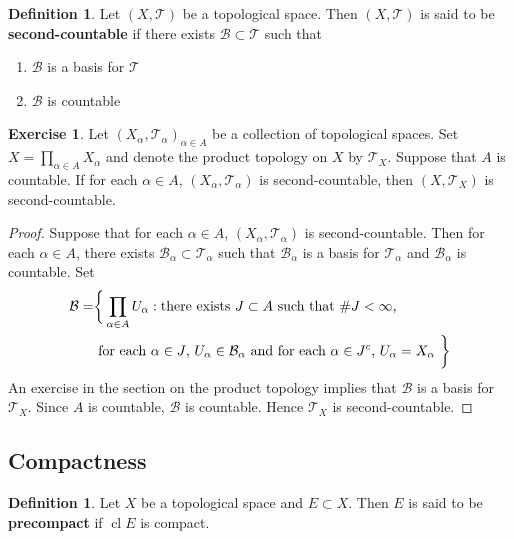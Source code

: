 \documentclass[12pt]{amsart}
\theoremstyle{definition}
\newtheorem{defn}[definition]{Definition}
\newtheorem{ex}[definition]{Exercise}
\newcommand{\al}{\alpha}
\newcommand{\MB}{\mathcal{B}}
\newcommand{\MT}{\mathcal{T}}
\newcommand{\tbf}[1]{\textbf{#1}}
\DeclareMathOperator{\cl}{cl}
\DeclareMathOperator*{\0}{\mbf{0}}
\DeclareMathOperator*{\1}{\mbf{1}}
\newcommand{\ld}[1]{\label{defn:#1}}
\begin{document}
	\begin{defn}
		Let $(X, \MT)$ be a topological space. Then $(X, \MT)$ is said to be \tbf{second-countable} if there exists $\MB \subset \MT$ such that 
		\begin{enumerate}
			\item $\MB$ is a basis for $\MT$
			\item $\MB$ is countable
		\end{enumerate} 
	\end{defn}

	\begin{ex}
		Let $(X_{\al}, \MT_{\al})_{\al \in A}$ be a collection of topological spaces. Set $X = \prod\limits_{\al \in A} X_{\al}$ and denote the product topology on $X$ by $\MT_X$. Suppose that $A$ is countable. If for each $\al \in A$, $(X_{\al}, \MT_{\al})$ is second-countable, then $(X, \MT_X)$ is second-countable. 
	\end{ex}

	\begin{proof}
		Suppose that for each $\al \in A$, $(X_{\al}, \MT_{\al})$ is second-countable. Then for each  $\al \in A$, there exists $\MB_{\al} \subset \MT_{\al}$ such that $\MB_{\al}$ is a basis for $\MT_{\al}$ and $\MB_{\al}$ is countable. Set 
		\begin{align*}
			\MB = 
			& \bigg \{\prod_{\al \in A} U_{\al}: \text{there exists $J \subset A$ such that $ \# J < \infty$, } \\
			& \text{ for each $\al \in J$, $U_{\al} \in \MB_{\al}$ and for each $\al \in J^c$, $U_{\al} = X_{\al}$ } \bigg \}
		\end{align*}  
		An exercise in the section on the product topology implies that $\MB$ is a basis for $\MT_X$. Since $A$ is countable, $\MB$ is countable. Hence $\MT_X$ is second-countable. 
	\end{proof}


	
	
	
	
	
	
	
	
	
	
	
	
	
	
	
	\newpage
	\subsection{Compactness}
	
	\begin{defn} \ld{}
		Let $X$ be a topological space and $E \subset X$. Then $E$ is said to be \tbf{precompact} if $\cl E$ is compact.
	\end{defn}
\end{document}
